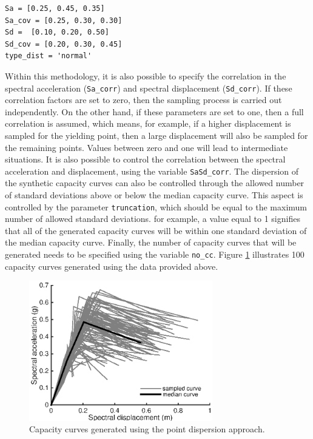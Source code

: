 \begin{Verbatim}[frame=single, commandchars=\\\{\}, samepage=true]
Sa = [0.25, 0.45, 0.35]
Sa_cov = [0.25, 0.30, 0.30]
Sd =  [0.10, 0.20, 0.50]
Sd_cov = [0.20, 0.30, 0.45]
type_dist = 'normal'
\end{Verbatim}

Within this methodology, it is also possible to specify the correlation in the spectral acceleration (\verb=Sa_corr=) and spectral displacement (\verb=Sd_corr=). If these correlation factors are set to zero, then the sampling process is carried out independently. On the other hand, if these parameters are set to one, then a full correlation is assumed, which means, for example, if a higher displacement is sampled for the yielding point, then a large displacement will also be sampled for the remaining points. Values between zero and one will lead to intermediate situations. It is also possible to control the correlation between the spectral acceleration and displacement, using the variable \verb=SaSd_corr=.
The dispersion of the synthetic capacity curves can also be controlled through the allowed number of standard deviations above or below the median capacity curve. This aspect is controlled by the parameter \verb=truncation=, which should be equal to the maximum number of allowed standard deviations. for example, a value equal to 1 signifies that all of the generated capacity curves will be within one standard deviation of the median capacity curve. Finally, the number of capacity curves that will be generated needs to be specified using the variable \verb=no_cc=. Figure \ref{fig:dispersion_cc} illustrates 100 capacity curves generated using the data provided above.

\begin{figure}[htb]
  \centering
      \includegraphics[width=8cm]{figures/dispersion_cc.eps}
  \caption{Capacity curves generated using the point dispersion approach.}
  \label{fig:dispersion_cc}
\end{figure}